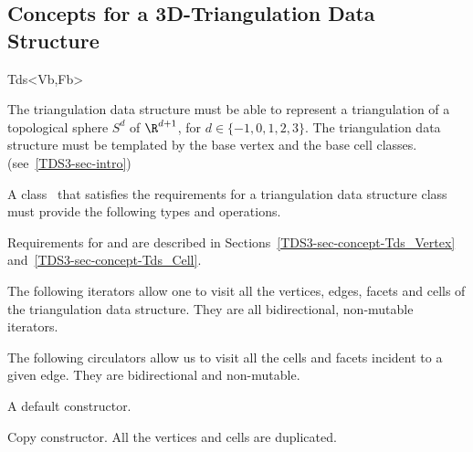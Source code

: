 \subsection{Concepts for a 3D-Triangulation Data Structure}
\label{TDS3-sec-concept} 
\begin{ccClassTemplate}{Tds<Vb,Fb>}

The triangulation data structure must be able to represent a
triangulation of a topological sphere $S^d$ of $\R^{d+1}$, for 
$d \in \{-1,0,1,2,3\}$.
The triangulation data structure must be templated by the base
vertex and the base cell classes. 
(see~\ref{TDS3-sec-intro})


A class \ccClassTemplateName\ that satisfies the requirements for a
triangulation data structure class must provide the following types and
operations. 

\ccTypes
{}
\ccThreeToTwo

\ccGlue
{}
Requirements for  and  are described in
Sections~\ref{TDS3-sec-concept-Tds_Vertex}
and~\ref{TDS3-sec-concept-Tds_Cell}.

\ccGlue
{} 


The following iterators allow one to visit all the vertices, edges, facets
and cells of the triangulation data structure. They are all
bidirectional, non-mutable iterators.

\ccGlue
{}
\ccGlue
{}
\ccGlue
{}

The following circulators allow us to visit all the cells and facets
incident to a given edge. They are bidirectional and non-mutable.

\ccGlue
{}

\ccCreation
{}

{A default constructor.}

{Copy constructor. All the vertices and cells are duplicated.}


\end{ccClassTemplate}
